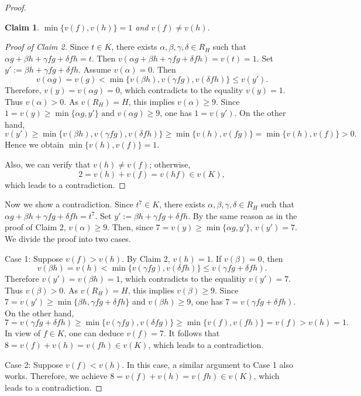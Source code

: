 \documentclass{amsart}
\theoremstyle{plain}
\newtheorem{claim}[]{Claim}
\theoremstyle{definition}
\numberwithin{theorem}{section}
\numberwithin{equation}{section}
\numberwithin{equation}{theorem}
\begin{document}
\begin{proof}
\begin{claim}
$\min\{v(f),v(h)\}=1$ and $v(f)\not=v(h)$.
\end{claim}

\begin{proof}[Proof of Claim 2]
Since $t\in K$, there exists $\alpha,\beta,\gamma,\delta \in R_H$ such that $\alpha g+\beta h+ \gamma fg +\delta fh=t$.
Then $v(\alpha g+\beta h+ \gamma fg +\delta fh)=v(t)=1$.
Set $y':=\beta h+ \gamma fg +\delta fh$.
Assume $v(\alpha)=0$.
Then 
\[
v(\alpha g)=v(g)<\min\{v(\beta h),v(\gamma fg), v(\delta fh)\} \le v(y').
\]
Therefore, $v(y)=v(\alpha g)=0$, which contradicts to the equality $v(y)=1$.
Thus $v(\alpha)>0$.
As $v(R_H)=H$, this implies $v(\alpha)\ge 9$.
Since $1=v(y) \ge \min\{\alpha g, y'\} \text{ and } v(\alpha g) \ge 9$, one has $1 = v(y')$.
On the other hand, 
\[
v(y') \ge \min\{v(\beta h), v(\gamma fg), v(\delta fh)\} \ge \min\{v(h), v(fg)\}=\min\{v(h), v(f)\}>0.
\]
Hence we obtain $\min\{v(h),v(f)\}=1$.

Also, we can verify that $v(h)\not=v(f)$; otherwise, 
\[
2=v(h)+v(f)=v(hf)\in v(K),
\]
which leads to a contradiction.
\end{proof}

Now we show a contradiction.
Since $t^7\in K$, there exists  $\alpha,\beta,\gamma,\delta \in R_H$ such that $\alpha g+\beta h+ \gamma fg +\delta fh=t^7$.
Set $y':=\beta h+ \gamma fg +\delta fh$.
By the same reason as in the proof of Claim 2, $v(\alpha)\ge 9$.
Then, since $7=v(y) \ge \min\{\alpha g, y'\}$, $v(y')=7$.
We divide the proof into two cases.

Case 1: Suppose $v(f)>v(h)$.
By Claim 2, $v(h)=1$.
If $v(\beta)=0$, then 
\[
v(\beta h)=v(h)< \min\{v(\gamma fg), v(\delta fh)\} \le v(\gamma fg+\delta fh).
\]
Therefore $v(y')=v(\beta h)=1$, which contradicts to the equalitiy $v(y')=7$.
Thus $v(\beta)>0$.
As $v(R_H)=H$, this implies $v(\beta)\ge 9$.
Since $7=v(y') \ge \min\{\beta h,\gamma fg+\delta fh\}$ and $v(\beta h) \ge 9$, one has $7=v(\gamma fg+\delta fh)$.
On the other hand,
\[
7=v(\gamma fg+\delta fh) \ge \min\{ v(\gamma fg),v(\delta fg)\} \ge \min\{v(f),v(fh)\}=v(f)>v(h)=1.
\]
In view of $f\in K$, one can deduce $v(f)=7$.
It follows that $8=v(f)+v(h)=v(fh)\in v(K)$, which leads to a contradiction.

Case 2: Suppose $v(f)<v(h)$.
In this case, a similar argument to Case 1 also works.
Therefore, we achieve $8=v(f)+v(h)=v(fh)\in v(K)$, which leads to a contradiction.
\end{proof}
\end{document}
